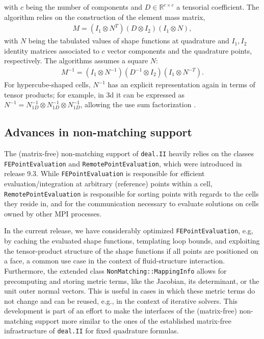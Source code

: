 \documentclass{ansarticle-preprint}
\newcommand{\specialword}[1]{\texttt{#1}}
\newcommand{\dealii}{{\specialword{deal.II}}\xspace}
\begin{document}
\begin{itemize}
with $c$ being the number of components and $D\in \mathbb{R}^{c\times c}$ a tensorial
coefficient. The algorithm relies on the construction of the element mass matrix,
\begin{align*}
M =  ( I_1 \otimes N^T) (D \otimes I_2 ) ( I_1 \otimes N),
\end{align*}
with $N$ being the tabulated values of shape functions at quadrature and
$I_1,I_2$ identity matrices associated to $c$ vector components and the
quadrature points, respectively.
The algorithms assumes a square $N$:
\begin{align*}
M^{-1} =  ( I_1 \otimes N^{-1}) (D^{-1} \otimes I_2 ) ( I_1 \otimes N^{-T}).
\end{align*}
For hypercube-shaped cells, $N^{-1}$ has an explicit representation
again in terms of tensor products; for example, in 3d it can be
expressed as $N^{-1} = N_{1D}^{-1} \otimes N_{1D}^{-1} \otimes
N_{1D}^{-1}$, allowing the use sum factorization \cite{kronbichler2016comparison}.
\end{itemize}

\subsection{Advances in non-matching support}\label{sec:nonmatching}

The (matrix-free) non-matching support of \dealii heavily relies
on the classes \texttt{FE\-Point\-Eval\-u\-ation} and \texttt{RemotePointEvaluation},
which were introduced in release 9.3. While \texttt{FE\-Point\-Eval\-u\-a\-tion}
is responsible for efficient evaluation/integration at arbitrary (reference)
points within a cell, \texttt{RemotePointEvaluation} is responsible for
sorting points with regards to the cells they reside in, and for the
communication necessary to evaluate solutions on cells owned by other
MPI processes.

In the current release, we have considerably optimized \texttt{FEPointEvaluation}, e.g,
by caching the evaluated shape functions, templating loop bounds, and
exploiting the tensor-product structure of the shape functions if all points are
positioned on a face, a common use case in the context of fluid-structure
interaction. Furthermore, the extended class \texttt{NonMatching::MappingInfo}
allows for precomputing and storing metric terms, like the Jacobian, its determinant,
or the unit outer normal vectors. This is useful in cases in which these metric terms do not change
and can be reused, e.g., in the context of iterative solvers. This development
is part of an effort to make the interfaces of the
(matrix-free) non-matching support more similar to the ones of the
established matrix-free infrastructure of \dealii for fixed quadrature formulas.
\end{document}
